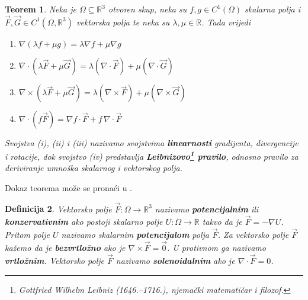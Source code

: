 \documentclass[12pt,a4paper]{article}
\makeatletter
\newtheorem{tm}{Teorem}[section]
\newtheorem{deff}[tm]{Definicija}
\renewenvironment{proof}[1][\proofname]{\par
  \pushQED{\qed}%
  \normalfont
  \topsep6\p@\@plus6\p@\relax
  \trivlist
  \item[\hskip\labelsep
  \bfseries #1\@addpunct{.}]\ignorespaces
}{%
  \popQED\endtrivlist\@endpefalse
}
\makeatother
\begin{document}
\begin{tm}
Neka je $\Omega \subseteq \mathbb{R}^3$ otvoren skup, neka su
$f,g \in C^1(\Omega)$ skalarna polja i
$\overrightarrow{F},\overrightarrow{G} \in C^1(\Omega,\mathbb{R}^3)$ vektorska polja te neka su
$\lambda,\mu \in \mathbb{R}$. Tada vrijedi
\begin{enumerate}
    \item[(i)]
    $
    \nabla(\lambda f+\mu g)
    =
    \lambda\nabla f+\mu\nabla g
    $

    \item[(ii)]
    $
    \nabla\cdot(\lambda\overrightarrow{F}+\mu\overrightarrow{G})
    =
    \lambda(\nabla\cdot\overrightarrow{F})
    +
    \mu(\nabla\cdot\overrightarrow{G})
    $

    \item[(iii)]
    $
    \nabla\times(\lambda\overrightarrow{F}+\mu\overrightarrow{G})
    =
    \lambda(\nabla\times\overrightarrow{F})
    +
    \mu(\nabla\times\overrightarrow{G})
    $

    \item[(iv)]
    $
    \nabla\cdot(f\overrightarrow{F})
    =
    \nabla f\cdot\overrightarrow{F}
    +
    f\,\nabla\cdot\overrightarrow{F}
    $
\end{enumerate}
Svojstva (i), (ii) i (iii) nazivamo svojstvima \textbf{linearnosti} gradijenta,
divergencije i rotacije, dok svojstvo (iv) predstavlja \textbf{Leibnizovo\footnote{Gottfried Wilhelm Leibniz (1646.--1716.), njemački matematičar i filozof.} pravilo},
odnosno pravilo za deriviranje umnoška skalarnog i vektorskog polja.
\end{tm}
\begin{proof}
    Dokaz teorema može se pronaći u \cite{uglesic}.
\end{proof}
\vspace{0.25cm}

\begin{deff}
Vektorsko polje
$\overrightarrow{F}:\Omega\to\mathbb{R}^3$
nazivamo \textbf{\textit{potencijalnim}} ili \textbf{\textit{konzervativnim}} ako postoji
skalarno polje $U:\Omega\to\mathbb{R}$ takvo da je
$\overrightarrow{F}=-\nabla U$. Pritom polje $U$ nazivamo skalarnim
\textbf{\textit{potencijalom}} polja $\overrightarrow{F}$. Za vektorsko polje
$\overrightarrow{F}$ kažemo da je \textbf{\textit{bezvrtložno}} ako je
$\nabla\times\overrightarrow{F}=\overrightarrow{0}$. U protivnom ga nazivamo
\textbf{\textit{vrtložnim}}. Vektorsko polje $\overrightarrow{F}$ nazivamo
\textbf{\textit{solenoidalnim}} ako je $\nabla\cdot\overrightarrow{F}=0$.
\end{deff}
\vspace{0.25cm}
\end{document}
